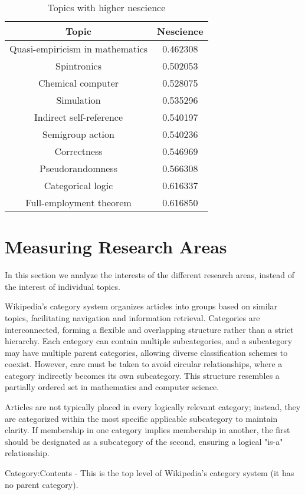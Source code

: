 \begin{table}
\begin{centering}
\begin{tabular}{|c|c|}
\hline 
Topic & Nescience \tabularnewline
\hline 
\hline
Quasi-empiricism in mathematics & 0.462308 \tabularnewline
\hline
Spintronics & 0.502053 \tabularnewline
\hline
Chemical computer & 0.528075 \tabularnewline
\hline
Simulation & 0.535296 \tabularnewline
\hline
Indirect self-reference & 0.540197 \tabularnewline
\hline
Semigroup action & 0.540236 \tabularnewline
\hline
Correctness & 0.546969 \tabularnewline
\hline
Pseudorandomness & 0.566308 \tabularnewline
\hline
Categorical logic & 0.616337 \tabularnewline
\hline
Full-employment theorem & 0.616850 \tabularnewline
\hline 
\end{tabular}
\par\end{centering}
\caption{\label{tab:Higher-nescience-of-topics}Topics with higher nescience}
\end{table}

%
%
\section{Measuring Research Areas}

In this section we analyze the interests of the different research areas, instead of the interest of individual topics.

Wikipedia's category system organizes articles into groups based on similar topics, facilitating navigation and information retrieval. Categories are interconnected, forming a flexible and overlapping structure rather than a strict hierarchy. Each category can contain multiple subcategories, and a subcategory may have multiple parent categories, allowing diverse classification schemes to coexist. However, care must be taken to avoid circular relationships, where a category indirectly becomes its own subcategory. This structure resembles a partially ordered set in mathematics and computer science. 

Articles are not typically placed in every logically relevant category; instead, they are categorized within the most specific applicable subcategory to maintain clarity. If membership in one category implies membership in another, the first should be designated as a subcategory of the second, ensuring a logical "is-a" relationship.

Category:Contents - This is the top level of Wikipedia's category system (it has no parent category).

